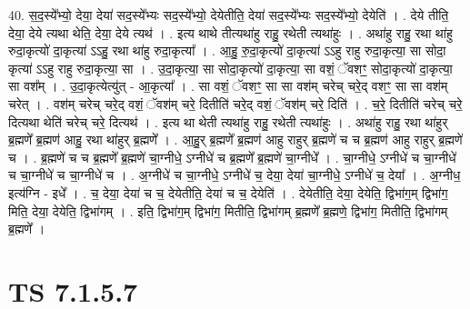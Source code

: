 \documentclass[17pt]{extarticle}
\begin{document}
40. स॒द॒स्ये᳚भ्यो॒ देया॒ देया॑ सद॒स्ये᳚भ्यः सद॒स्ये᳚भ्यो॒ देयेतीति॒ देया॑ सद॒स्ये᳚भ्यः सद॒स्ये᳚भ्यो॒ देयेति॑ । . देये तीति॒ देया॒ देये त्यथा थेति॒ देया॒ देये त्यथ॑ । . इत्य थाथे तीत्यथा॑हु राहु॒ रथेती त्यथा॑हुः । . अथा॑हु राहु॒ रथा था॑हु रुदा॒कृत्यो॑ दा॒कृत्या॑ ऽऽहु॒ रथा था॑हु रुदा॒कृत्या᳚ । . आ॒हु॒ रु॒दा॒कृत्यो॑ दा॒कृत्या॑ ऽऽहु राहु रुदा॒कृत्या॒ सा सोदा॒ कृत्या॑ ऽऽहु राहु रुदा॒कृत्या॒ सा । . उ॒दा॒कृत्या॒ सा सोदा॒कृत्यो॑ दा॒कृत्या॒ सा वशं॒ ॅवशꣳ॒॒ सोदा॒कृत्यो॑ दा॒कृत्या॒ सा वश᳚म् । . उ॒दा॒कृत्येत्यु॑त् - आ॒कृत्या᳚ । . सा वशं॒ ॅवशꣳ॒॒ सा सा वश॑म् चरेच् चरे॒द् वशꣳ॒॒ सा सा वश॑म् चरेत् । . वश॑म् चरेच् चरे॒द् वशं॒ ॅवश॑म् चरे॒ दितीति॑ चरे॒द् वशं॒ ॅवश॑म् चरे॒ दिति॑ । . च॒रे॒ दितीति॑ चरेच् चरे॒ दित्यथा थेति॑ चरेच् चरे॒ दित्यथ॑ । . इत्य था थेती त्यथा॑हु राहु॒ रथेती त्यथा॑हुः । . अथा॑हु राहु॒ रथा था॑हुर् ब्र॒ह्मणे᳚ ब्र॒ह्मण॑ आहु॒ रथा था॑हुर् ब्र॒ह्मणे᳚ । . आ॒हु॒र् ब्र॒ह्मणे᳚ ब्र॒ह्मण॑ आहु राहुर् ब्र॒ह्मणे॑ च च ब्र॒ह्मण॑ आहु राहुर् ब्र॒ह्मणे॑ च । . ब्र॒ह्मणे॑ च च ब्र॒ह्मणे᳚ ब्र॒ह्मणे॑ चा॒ग्नीधे॒ ऽग्नीधे॑ च ब्र॒ह्मणे᳚ ब्र॒ह्मणे॑ चा॒ग्नीधे᳚ । . चा॒ग्नीधे॒ ऽग्नीधे॑ च चा॒ग्नीधे॑ च चा॒ग्नीधे॑ च चा॒ग्नीधे॑ च । . अ॒ग्नीधे॑ च चा॒ग्नीधे॒ ऽग्नीधे॑ च॒ देया॒ देया॑ चा॒ग्नीधे॒ ऽग्नीधे॑ च॒ देया᳚ । . अ॒ग्नीध॒ इत्य॑ग्नि - इधे᳚ । . च॒ देया॒ देया॑ च च॒ देयेतीति॒ देया॑ च च॒ देयेति॑ । . देयेतीति॒ देया॒ देयेति॒ द्विभा॑ग॒म् द्विभा॑ग॒ मिति॒ देया॒ देयेति॒ द्विभा॑गम् । . इति॒ द्विभा॑ग॒म् द्विभा॑ग॒ मितीति॒ द्विभा॑गम् ब्र॒ह्मणे᳚ ब्र॒ह्मणे॒ द्विभा॑ग॒ मितीति॒ द्विभा॑गम् ब्र॒ह्मणे᳚ । \newline
\pagebreak
{}

\section{ TS 7.1.5.7 }
\end{document}
